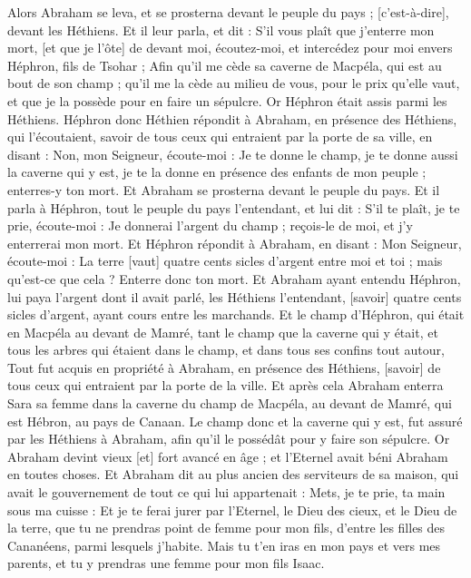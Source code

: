 \begin{multicols}{2}
Alors Abraham se leva, et se prosterna devant le peuple du pays ; [c'est-à-dire], devant les Héthiens.
Et il leur parla, et dit : S'il vous plaît que j'enterre mon mort, [et que je l'ôte] de devant moi, écoutez-moi, et intercédez pour moi envers Héphron, fils de Tsohar ;
Afin qu'il me cède sa caverne de Macpéla, qui est au bout de son champ ; qu'il me la cède au milieu de vous, pour le prix qu'elle vaut, et que je la possède pour en faire un sépulcre.
Or Héphron était assis parmi les Héthiens. Héphron donc Héthien répondit à Abraham, en présence des Héthiens, qui l'écoutaient, savoir de tous ceux qui entraient par la porte de sa ville, en disant :
Non, mon Seigneur, écoute-moi : Je te donne le champ, je te donne aussi la caverne qui y est, je te la donne en présence des enfants de mon peuple ; enterres-y ton mort.
Et Abraham se prosterna devant le peuple du pays.
Et il parla à Héphron, tout le peuple du pays l'entendant, et lui dit : S'il te plaît, je te prie, écoute-moi : Je donnerai l'argent du champ ; reçois-le de moi, et j'y enterrerai mon mort.
Et Héphron répondit à Abraham, en disant :
Mon Seigneur, écoute-moi : La terre [vaut] quatre cents sicles d'argent entre moi et toi ; mais qu'est-ce que cela ? Enterre donc ton mort.
Et Abraham ayant entendu Héphron, lui paya l'argent dont il avait parlé, les Héthiens l'entendant, [savoir] quatre cents sicles d'argent, ayant cours entre les marchands.
Et le champ d'Héphron, qui était en Macpéla au devant de Mamré, tant le champ que la caverne qui y était, et tous les arbres qui étaient dans le champ, et dans tous ses confins tout autour,
Tout fut acquis en propriété à Abraham, en présence des Héthiens, [savoir] de tous ceux qui entraient par la porte de la ville.
Et après cela Abraham enterra Sara sa femme dans la caverne du champ de Macpéla, au devant de Mamré, qui est Hébron, au pays de Canaan.
Le champ donc et la caverne qui y est, fut assuré par les Héthiens à Abraham, afin qu'il le possédât pour y faire son sépulcre.
\VerseOne{}Or Abraham devint vieux [et] fort avancé en âge ; et l'Eternel avait béni Abraham en toutes choses.
Et Abraham dit au plus ancien des serviteurs de sa maison, qui avait le gouvernement de tout ce qui lui appartenait : Mets, je te prie, ta main sous ma cuisse :
Et je te ferai jurer par l'Eternel, le Dieu des cieux, et le Dieu de la terre, que tu ne prendras point de femme pour mon fils, d'entre les filles des Cananéens, parmi lesquels j'habite.
Mais tu t'en iras en mon pays et vers mes parents, et tu y prendras une femme pour mon fils Isaac.

\end{multicols}
